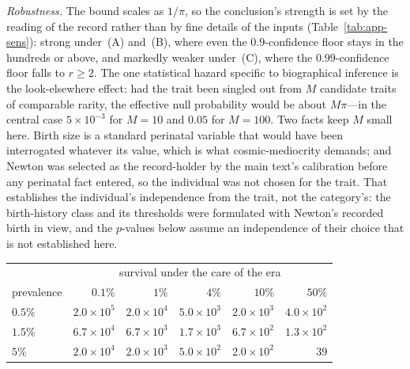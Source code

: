 \documentclass{article}
\begin{document}
\emph{Robustness.} The bound scales as $1/\pi$, so the conclusion's strength is set by the reading of the record rather than by fine details of the inputs (Table~\ref{tab:app-sens}): strong under~(A) and~(B), where even the $0.9$-confidence floor stays in the hundreds or above, and markedly weaker under~(C), where the $0.99$-confidence floor falls to $r \geq 2$. The one statistical hazard specific to biographical inference is the look-elsewhere effect: had the trait been singled out from $M$ candidate traits of comparable rarity, the effective null probability would be about $M\pi$---in the central case $5 \times 10^{-3}$ for $M = 10$ and $0.05$ for $M = 100$. Two facts keep $M$ small here. Birth size is a standard perinatal variable that would have been interrogated whatever its value, which is what cosmic-mediocrity demands; and Newton was selected as the record-holder by the main text's calibration before any perinatal fact entered, so the individual was not chosen for the trait. That establishes the individual's independence from the trait, not the category's: the birth-history class and its thresholds were formulated with Newton's recorded birth in view, and the $p$-values below assume an independence of their choice that is not established here.

\par\smallskip\begin{center}\footnotesize
  \label{tab:app-sens}
  \medskip
  \begin{tabular}{l r r r r r}
    \hline
    & \multicolumn{5}{c}{survival under the care of the era} \\
    prevalence & $0.1\%$ & $1\%$ & $4\%$ & $10\%$ & $50\%$ \\
    \hline
    $0.5\%$ & $2.0\times10^{5}$ & $2.0\times10^{4}$ & $5.0\times10^{3}$ & $2.0\times10^{3}$ & $4.0\times10^{2}$ \\
    $1.5\%$ & $6.7\times10^{4}$ & $6.7\times10^{3}$ & $1.7\times10^{3}$ & $6.7\times10^{2}$ & $1.3\times10^{2}$ \\
    $5\%$   & $2.0\times10^{4}$ & $2.0\times10^{3}$ & $5.0\times10^{2}$ & $2.0\times10^{2}$ & $39$ \\
    \hline
  \end{tabular}
\end{center}
\end{document}
